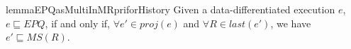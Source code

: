 \begin{restatable}{lemma}{EPQasMultiInMRpriforHistory}
\label{lemma:EPQ as multi in MRpri for history}
Given a data-differentiated execution $e$, $e \sqsubseteq \textit{EPQ}$, if and only if, $\forall e' \in \textit{proj}(e)$ and $\forall R \in \textit{last}(e')$, we have $e' \sqsubseteq \textit{MS}(R)$.
\end{restatable}
